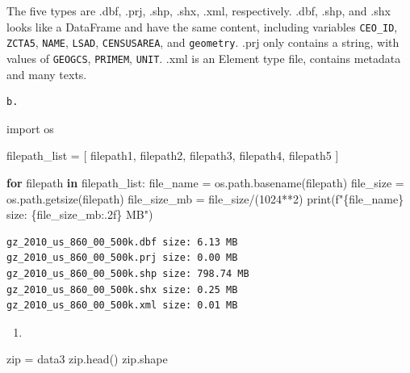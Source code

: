 \documentclass[
  letterpaper,
  DIV=11,
  numbers=noendperiod]{scrartcl}
\newenvironment{Shaded}{\begin{snugshade}}{\end{snugshade}}
\newcommand{\BuiltInTok}[1]{\textcolor[rgb]{0.00,0.23,0.31}{#1}}
\newcommand{\ControlFlowTok}[1]{\textcolor[rgb]{0.00,0.23,0.31}{\textbf{#1}}}
\newcommand{\DecValTok}[1]{\textcolor[rgb]{0.68,0.00,0.00}{#1}}
\newcommand{\ImportTok}[1]{\textcolor[rgb]{0.00,0.46,0.62}{#1}}
\newcommand{\KeywordTok}[1]{\textcolor[rgb]{0.00,0.23,0.31}{\textbf{#1}}}
\newcommand{\NormalTok}[1]{\textcolor[rgb]{0.00,0.23,0.31}{#1}}
\newcommand{\OperatorTok}[1]{\textcolor[rgb]{0.37,0.37,0.37}{#1}}
\newcommand{\SpecialCharTok}[1]{\textcolor[rgb]{0.37,0.37,0.37}{#1}}
\newcommand{\SpecialStringTok}[1]{\textcolor[rgb]{0.13,0.47,0.30}{#1}}
\providecommand{\tightlist}{%
  \setlength{\itemsep}{0pt}\setlength{\parskip}{0pt}}\usepackage{longtable,booktabs,array}
\begin{document}
The five types are .dbf, .prj, .shp, .shx, .xml, respectively. .dbf,
.shp, and .shx looks like a DataFrame and have the same content,
including variables \texttt{CEO\_ID}, \texttt{ZCTA5}, \texttt{NAME},
\texttt{LSAD}, \texttt{CENSUSAREA}, and \texttt{geometry}. .prj only
contains a string, with values of \texttt{GEOGCS}, \texttt{PRIMEM},
\texttt{UNIT}. .xml is an Element type file, contains metadata and many
texts.

\begin{verbatim}
b. 
\end{verbatim}

\begin{Shaded}
\begin{Highlighting}[]
\ImportTok{import}\NormalTok{ os}

\NormalTok{filepath\_list }\OperatorTok{=}\NormalTok{ [}
\NormalTok{    filepath1,}
\NormalTok{    filepath2,}
\NormalTok{    filepath3,}
\NormalTok{    filepath4,}
\NormalTok{    filepath5}
\NormalTok{]}

\ControlFlowTok{for}\NormalTok{ filepath }\KeywordTok{in}\NormalTok{ filepath\_list:}
\NormalTok{    file\_name }\OperatorTok{=}\NormalTok{ os.path.basename(filepath)}
\NormalTok{    file\_size }\OperatorTok{=}\NormalTok{ os.path.getsize(filepath)}
\NormalTok{    file\_size\_mb }\OperatorTok{=}\NormalTok{ file\_size}\OperatorTok{/}\NormalTok{(}\DecValTok{1024}\OperatorTok{**}\DecValTok{2}\NormalTok{)}
    \BuiltInTok{print}\NormalTok{(}\SpecialStringTok{f"}\SpecialCharTok{\{}\NormalTok{file\_name}\SpecialCharTok{\}}\SpecialStringTok{ size: }\SpecialCharTok{\{}\NormalTok{file\_size\_mb}\SpecialCharTok{:.2f\}}\SpecialStringTok{ MB"}\NormalTok{)}
\end{Highlighting}
\end{Shaded}

\begin{verbatim}
gz_2010_us_860_00_500k.dbf size: 6.13 MB
gz_2010_us_860_00_500k.prj size: 0.00 MB
gz_2010_us_860_00_500k.shp size: 798.74 MB
gz_2010_us_860_00_500k.shx size: 0.25 MB
gz_2010_us_860_00_500k.xml size: 0.01 MB
\end{verbatim}

\begin{enumerate}
\def\labelenumi{\arabic{enumi}.}
\setcounter{enumi}{1}
\tightlist
\item
\end{enumerate}

\begin{Shaded}
\begin{Highlighting}[]
\BuiltInTok{zip} \OperatorTok{=}\NormalTok{ data3}
\BuiltInTok{zip}\NormalTok{.head()}
\BuiltInTok{zip}\NormalTok{.shape}
\end{Highlighting}
\end{Shaded}
\end{document}
